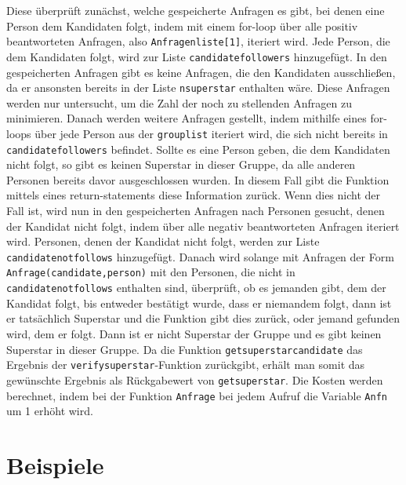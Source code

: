 \documentclass[a4paper,10pt,ngerman]{scrartcl}
\begin{document}
Diese überprüft zunächst, welche gespeicherte Anfragen es gibt, bei denen eine Person dem Kandidaten folgt, indem mit einem for-loop über alle positiv beantworteten Anfragen, also \lstinline|Anfragenliste[1]|, iteriert wird. Jede Person, die dem Kandidaten folgt, wird zur Liste \lstinline|candidatefollowers| hinzugefügt. In den gespeicherten Anfragen gibt es keine Anfragen, die den Kandidaten ausschließen, da er ansonsten bereits in der Liste \lstinline|nsuperstar| enthalten wäre. Diese Anfragen werden nur untersucht, um die Zahl der noch zu stellenden Anfragen zu minimieren.
Danach werden weitere Anfragen gestellt, indem mithilfe eines for-loops über jede Person aus der \lstinline|grouplist| iteriert wird, die sich nicht bereits in \lstinline|candidatefollowers| befindet. Sollte es eine Person geben, die dem Kandidaten nicht folgt, so gibt es keinen Superstar in dieser Gruppe, da alle anderen Personen bereits davor ausgeschlossen wurden. In diesem Fall gibt die Funktion mittels eines return-statements diese Information zurück.
Wenn dies nicht der Fall ist, wird nun in den gespeicherten Anfragen nach Personen gesucht, denen der Kandidat nicht folgt, indem über alle negativ beantworteten Anfragen iteriert wird. Personen, denen der Kandidat nicht folgt, werden zur Liste \lstinline|candidatenotfollows| hinzugefügt.
Danach wird solange mit Anfragen der Form \lstinline|Anfrage(candidate,person)| mit den Personen, die nicht in \lstinline|candidatenotfollows| enthalten sind, überprüft, ob es jemanden gibt, dem der Kandidat folgt, bis entweder bestätigt wurde, dass er niemandem folgt, dann ist er tatsächlich Superstar und die Funktion gibt dies zurück, oder jemand gefunden wird, dem er folgt. Dann ist er nicht Superstar der Gruppe und es gibt keinen Superstar in dieser Gruppe. Da die Funktion \lstinline|getsuperstarcandidate| das Ergebnis der \lstinline|verifysuperstar|-Funktion zurückgibt, erhält man somit das gewünschte Ergebnis als Rückgabewert von \lstinline|getsuperstar|.
Die Kosten werden berechnet, indem bei der Funktion \lstinline|Anfrage| bei jedem Aufruf die Variable \lstinline|Anfn| um 1 erhöht wird.
\section{Beispiele}
\end{document}
